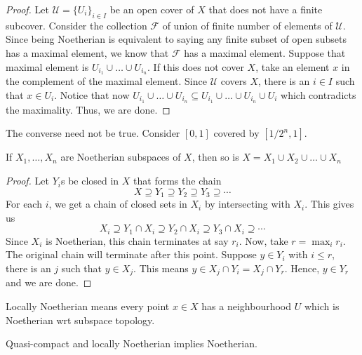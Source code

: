 \documentclass[oneside, 12pt, ]{scrbook}
\theoremstyle{theorem}
\begin{document}
\begin{proof}
Let $\mathcal{U}=\{U_{i}\}_{i \in I}$ be an open cover of $X$ that does not have a finite subcover. Consider the collection $\mathcal{F}$ of union of finite number of elements of $\mathcal{U}$. Since being Noetherian is equivalent to saying any finite subset of open subsets has a maximal element, we know that $\mathcal{F}$ has a maximal element. Suppose that maximal element is $U_{i_{1}} \cup \hdots \cup U_{i_{n}}$. If this does not cover $X$, take an element $x$ in the complement of the maximal element. Since $\mathcal{U}$ covers $X$, there is an $i \in I$ such that $x \in U_{i}$. Notice that now $U_{i_{1}} \cup \hdots \cup U_{i_{n}} \subseteq U_{i_{1}} \cup \hdots \cup U_{i_{n}} \cup U_{i}$ which contradicts the maximality. Thus, we are done.  
\end{proof}

\begin{remark}
The converse need not be true. Consider $[0,1]$ covered by $[1/2^n , 1]$.
\end{remark}

\begin{lemma}
If $X_{1}, \hdots , X_{n}$ are Noetherian subspaces of $X$, then so is $X=X_{1} \cup X_{2} \cup \hdots \cup X_{n}$
\end{lemma}

\begin{proof}
Let $Y_{i}$s be closed in $X$ that forms the chain $$X \supseteq Y_{1} \supseteq Y_{2} \supseteq Y_{3} \supseteq \cdots $$ For each $i$, we get a chain of closed sets in $X_{i}$ by intersecting with $X_{i}$. This gives us $$X_{i} \supseteq Y_{1}\cap X_{i} \supseteq Y_{2}\cap X_{i} \supseteq Y_{3}\cap X_{i} \supseteq \cdots $$ Since $X_{i}$ is Noetherian, this chain terminates at say $r_{i}$. Now, take $r = \max_{i} r_{i}$. The original chain will terminate after this point. Suppose $y \in Y_{i}$ with $i \le r$, there is an $j$ such that $y \in X_{j}$. This means $y \in X_{j} \cap Y_{i} = X_{j} \cap Y_{r}$. Hence, $y \in Y_{r}$ and we are done.
\end{proof}

\begin{definition}
Locally Noetherian means every point $x\in X$ has a neighbourhood $U$ which is Noetherian wrt subspace topology.
\end{definition}

\begin{lemma}
Quasi-compact and locally Noetherian implies Noetherian.
\end{lemma}
\end{document}
